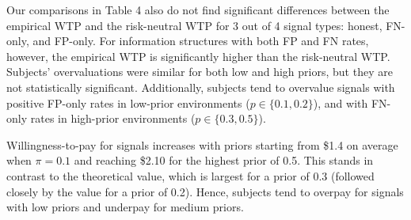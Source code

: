 \documentclass[12pt,a4paper]{article}
\newcommand{\agt}[1]{{\color{OliveGreen}#1}}
\begin{document}
Our comparisons in Table 4 also do not find significant differences between the empirical WTP and the risk-neutral WTP for 3 out of 4 signal types: honest, FN-only, and FP-only. For information structures with both FP and FN rates, however, the empirical WTP is significantly higher than the risk-neutral WTP. Subjects' overvaluations were similar for both low and high priors, but they are not statistically significant. Additionally, subjects tend to overvalue signals with positive FP-only rates in low-prior environments ($p \in \{0.1,0.2\}$), and with FN-only rates in high-prior environments ($p \in \{0.3,0.5\}$).

Willingness-to-pay for signals increases with priors starting from \$1.4 on average when $\pi=0.1$ and reaching \$2.10 for the highest prior of 0.5. This stands in contrast to the theoretical value, which is largest for a prior of 0.3 (followed closely by the value for a prior of 0.2). Hence, subjects tend to overpay for signals with low priors and underpay for medium priors.




\end{document}
